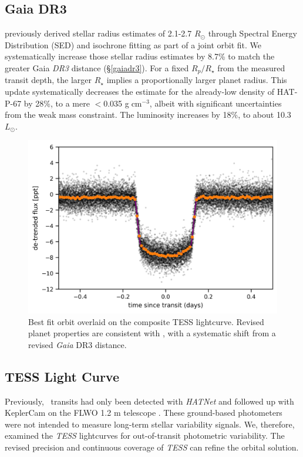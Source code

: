 \documentclass[twocolumn]{aastex631}
\newcommand{\hatpb}{\object{HAT-P-67 b}}
\begin{document}
\subsection{Gaia DR3}\label{analysisgaiaDR3}
\citet{2017AJ....153..211Z} previously derived stellar radius estimates of 2.1-2.7 $R_\odot$ through Spectral Energy Distribution (SED) and isochrone fitting as part of a joint orbit fit.  We systematically increase those stellar radius estimates by 8.7\% to match the greater Gaia \emph{DR3} distance (\S \ref{gaiadr3}).  For a fixed $R_p/R_\star$ from the measured transit depth, the larger $R_\star$ implies a proportionally larger planet radius. This update systematically decreases the estimate for the already-low density of HAT-P-67 by 28\%, to a mere $<$0.035 g$\;$cm$^{-3}$, albeit with significant uncertainties from the weak mass constraint.  The luminosity increases by 18\%, to about 10.3 $L_\odot$.

\begin{figure}
    \includegraphics[width=\linewidth]{figures/best_fit_orbit.png}
    \caption{Best fit orbit overlaid on the composite TESS lightcurve.  Revised planet properties are consistent with \citet{2017AJ....153..211Z}, with a systematic shift from a revised \emph{Gaia} DR3 distance.}
    \label{fig:transit}
\end{figure}

\subsection{TESS Light Curve}
Previously, \hatpb~transits had only been detected with \emph{HATNet} \citep{2004PASP..116..266B} and followed up with KeplerCam on the FLWO 1.2 m telescope \citep{2017AJ....153..211Z}. These ground-based photometers were not intended to measure long-term stellar variability signals.  We, therefore, examined the \emph{TESS} lightcurves for out-of-transit photometric variability.  The revised precision and continuous coverage of \emph{TESS} can refine the orbital solution.
\end{document}
